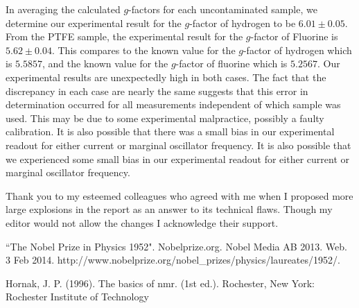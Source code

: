 \documentclass[prb,preprint]{revtex4-1}
\begin{document}
In averaging the calculated $g$-factors for each uncontaminated sample, we determine our experimental result for the $g$-factor of hydrogen to be $6.01\pm0.05$. From the PTFE sample, the experimental result for the $g$-factor of Fluorine is $5.62\pm0.04$. This compares to the known value for the $g$-factor of hydrogen which is $5.5857$, and the known value for the $g$-factor of fluorine which is $5.2567$. Our experimental results are unexpectedly high in both cases. The fact that the discrepancy in each case are nearly the same suggests that this error in determination occurred for all measurements independent of which sample was used. This may be due to some experimental malpractice, possibly a faulty calibration. It is also possible that there was a small bias in our experimental readout for either current or marginal oscillator frequency. It is also possible that we experienced some small bias in our experimental readout for either current or marginal oscillator frequency.

\newpage

\begin{acknowledgments}

Thank you to my esteemed colleagues who agreed with me when I proposed more large explosions in the report as an answer to its technical flaws. Though my editor would not allow the changes I acknowledge their support.

\end{acknowledgments}


\begin{thebibliography}{99}

 ``The Nobel Prize in Physics 1952". Nobelprize.org. Nobel Media AB 2013. Web. 3 Feb 2014. http://www.nobelprize.org/nobel\_prizes/physics/laureates/1952/.

 Hornak, J. P. (1996). The basics of nmr. (1st ed.). Rochester, New York: Rochester Institute of Technology

\end{thebibliography}
\end{document}
